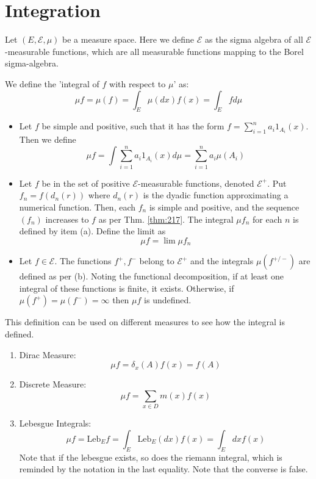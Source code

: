 \fullpageboxline
\section{Integration}
Let $(E, \mathcal{E}, \mu)$ be a measure space. Here we define $\mathcal{E}$ as the sigma algebra of all $\mathcal{E}$-measurable functions, which are all measurable functions mapping to the Borel sigma-algebra. 

We define the 'integral of $f$ with respect to $\mu$' as:
\begin{equation}
	\mu f = \mu(f) = \int_E\mu(dx)f(x) = \int_E fd\mu
\end{equation}

\begin{definition}
	\begin{itemize}
	\item Let $f$ be simple and positive, such that it has the form $f = \sum_{i =1}^{n} a_i 1_{A_i}(x)$. Then we define \[\mu f = \int  \sum_{i =1}^{n} a_i 1_{A_i}(x) d\mu =  \sum_{i= 1}^{n} a_i \mu(A_i)\]
	\item Let $f$ be in the set of positive $\mathcal{E}$-measurable functions, denoted $\mathcal{E}^+$. Put $f_n = f(d_n(r))$ where $d_n(r)$ is the dyadic function approximating a numerical function. Then, each $f_n$ is simple and positive, and the sequence $(f_n)$ increases to $f$ as per Thm. \ref{thm:217}. The integral $\mu f_n$ for each $n$ is defined by item (a). Define the limit as \begin{equation}
		\mu f= \lim \mu f_n
	\end{equation}
	\item Let $f \in \mathcal{E}$. The functions $f^+, f^-$ belong to $\mathcal{E}^+$ and the integrals $\mu(f^{+/-})$ are defined as per (b). Noting the functional decomposition, if at least one integral of these functions is finite, it exists. Otherwise, if $\mu(f^+) = \mu(f^-) = \infty$ then $\mu f$ is undefined.
	\end{itemize}
\end{definition}

This definition can be used on different measures to see how the integral is defined. 
\begin{enumerate}
	\item Dirac Measure: \[\mu f = \delta_x(A) f(x) = f(A)\]
	\item Discrete Measure: \[\mu f = \sum_{x\in D} m(x)f(x)\]
	\item Lebesgue Integrals:\[\mu f = \text{Leb}_E f = \int_E \text{Leb}_E(dx) f(x) = \int_E dx f(x)\] Note that if the lebesgue exists, so does the riemann integral, which is reminded by the notation in the last equality. Note that the converse is false. 
\end{enumerate}

